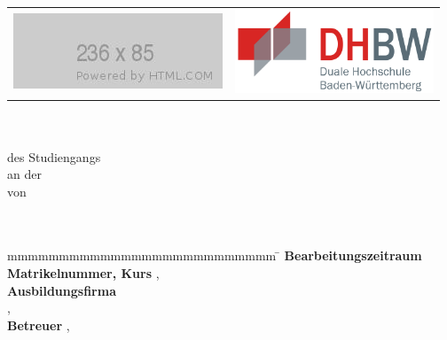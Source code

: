 
\begin{titlepage}
	\begin{longtable}{p{8.2cm} p{5.4cm}}
		\includegraphics{Abbildungen/FirmenLogo.jpg} &
		\includegraphics[height=2.5cm]{Abbildungen/DHBW.png}
	\end{longtable}
	\enlargethispage{20mm}
	\begin{center}
		\vspace*{12mm}	\LARGE\textbf{\titel}\\
		\vspace*{12mm}	\large\textbf{\arbeit}\\
		\vspace*{12mm}	des Studiengangs \studiengang\\
    \vspace*{3mm}		an der \dhbw\\
		\vspace*{12mm}	von\\
		\vspace*{3mm}		\large\textbf{\autor}\\
		\vspace*{12mm}	\datumAbgabe\\
	\end{center}
	\vfill
	\begin{spacing}{1.2}
	\begin{tabbing}
		mmmmmmmmmmmmmmmmmmmmmmmmmm             \= \kill
		\textbf{Bearbeitungszeitraum}      		\>  \bearbeitungsZeitraum\\
		\textbf{Matrikelnummer, Kurs}  			\>  \matrikelnr, \kurs\\
		\textbf{Ausbildungsfirma}              \>  \firma\\
		\> \firmaRechtsform, \firmaOrt\\
		\textbf{Betreuer}               		\>  \betreuer,\\
		\> \betreuerTitel
	\end{tabbing}
	\end{spacing}
\end{titlepage}
